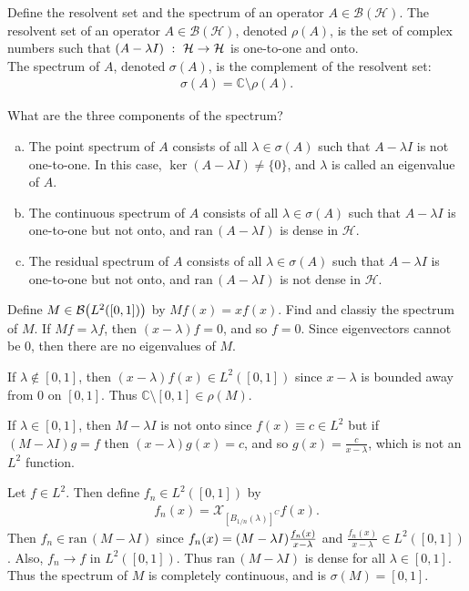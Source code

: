 \documentclass[avery5388,grid,frame]{flashcards}
\newcommand{\ran}{\mathrm{ran}\,}
\newcommand{\f}[3]{#1\ :\ #2 \rightarrow #3}
\def\Cx{\mathbb{C}}
\def\hilb{\mathcal{H}}
\begin{document}
\begin{flashcard}
    {Define the resolvent set and the spectrum of an operator $A \in \mathcal{B}(\hilb)$.}
    The resolvent set of an operator $A \in \mathcal{B}(\hilb)$, denoted $\rho(A)$, is the set of complex numbers such that $\f{\qty(A - \lambda I)}{\hilb}{\hilb}$ is one-to-one and onto. \\

    The spectrum of $A$, denoted $\sigma(A)$, is the complement of the resolvent set:
    \begin{align*}
        \sigma(A) = \Cx\setminus\rho(A).
    \end{align*}
\end{flashcard}

\begin{flashcard}
    {What are the three components of the spectrum?}
    \begin{enumerate}[(a)]
        \item The point spectrum of $A$ consists of all $\lambda \in \sigma(A)$ such that $A - \lambda I$ is not one-to-one.  In this case, $\ker(A - \lambda I) \neq \{0\}$, and $\lambda$ is called an eigenvalue of $A$.
        \item The continuous spectrum of $A$ consists of all $\lambda \in \sigma(A)$ such that $A - \lambda I$ is one-to-one but not onto, and $\ran(A - \lambda I)$ is dense in $\hilb$.
        \item The residual spectrum of $A$ consists of all $\lambda \in \sigma(A)$ such that $A - \lambda I$ is one-to-one but not onto, and $\ran(A - \lambda I)$ is not dense in $\hilb$.
    \end{enumerate}
\end{flashcard}

\begin{flashcard}
    {Define $M \in \mathcal{B}\qty(L^2\qty(\qty[0,1]))$ by $Mf(x) = xf(x)$.  Find and classiy the spectrum of $M$.}
    If $Mf = \lambda f$, then $(x - \lambda)f = 0$, and so $f = 0$.  Since eigenvectors cannot be $0$, then there are no eigenvalues of $M$.

    If $\lambda \not\in [0,1]$, then $(x - \lambda)f(x) \in L^2([0,1])$ since $x - \lambda$ is bounded away from $0$ on $[0,1]$.  Thus $\Cx \setminus [0,1] \in \rho(M)$. 

    If $\lambda \in [0,1]$, then $M - \lambda I$ is not onto since $f(x) \equiv c \in L^2$ but if $(M - \lambda I)g = f$ then $(x - \lambda) g(x) = c$, and so $g(x) = \frac{c}{x - \lambda}$, which is not an $L^2$ function.

    Let $f \in L^2$.  Then define $f_n \in L^2([0,1])$ by
    \begin{align*}
        f_n(x) = \mathcal{X}_{[B_{1/n}(\lambda)]^C}f(x).
    \end{align*}
    Then $f_n \in \ran (M - \lambda I)$ since $f_n(x) = \qty(M - \lambda I)\frac{f_n(x)}{x - \lambda}$ and $\frac{f_n(x)}{x - \lambda} \in L^2([0,1])$.  Also, $f_n \rightarrow f$ in $L^2([0,1])$.  Thus $\ran(M - \lambda I)$ is dense for all $\lambda \in [0,1]$.  Thus the spectrum of $M$ is completely continuous, and is $\sigma(M) = [0,1]$.
\end{flashcard}
\end{document}
